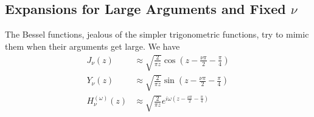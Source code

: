 \subsection{Expansions for Large Arguments and Fixed $\nu$}
The Bessel functions, jealous of the simpler trigonometric functions, 
try to mimic them when their arguments get large. We have
  \begin{subequations}
  \begin{align}
   J_\nu(z)		&\approx \sqrt{\frac{2}{\pi z}}\cos\left(z-\frac{\nu\pi}{2}-\frac{\pi}{4}\right)	\\
   Y_\nu(z)		&\approx \sqrt{\frac{2}{\pi z}}\sin\left(z-\frac{\nu\pi}{2}-\frac{\pi}{4}\right)	\\
   H_\nu^{(\omega)}(z)	&\approx \sqrt{\frac{2}{\pi z}}e^{i\omega\left(z-\frac{\nu\pi}{2}-\frac{\pi}{4}\right)}\label{eq:app.Bessel.asymptoticHankel}
  \end{align}
  \end{subequations}
